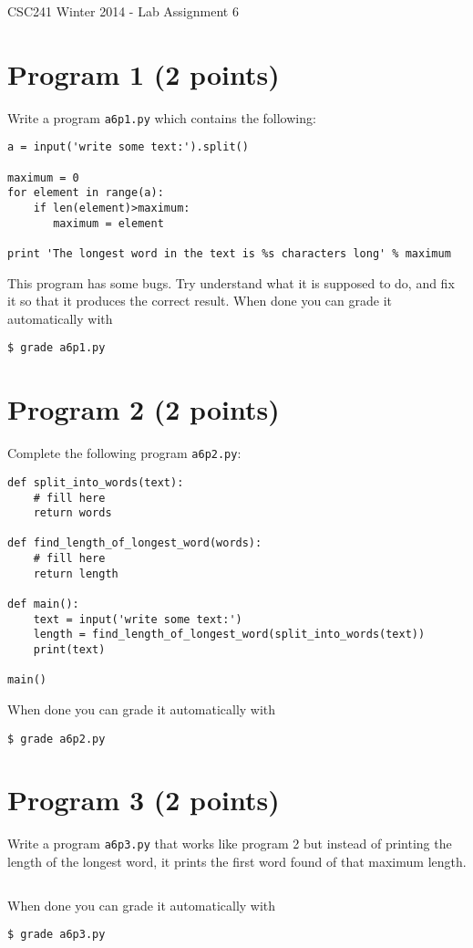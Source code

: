 \documentclass[12pt]{article}
\begin{document}
{\Large CSC241 Winter 2014 - Lab Assignment 6}

\section{Program 1 (2 points)}

\noindent
Write a program {\tt a6p1.py} which contains the following:
\begin{verbatim}
a = input('write some text:').split()

maximum = 0
for element in range(a):
    if len(element)>maximum:
       maximum = element

print 'The longest word in the text is %s characters long' % maximum
\end{verbatim}
This program has some bugs. Try understand what it is supposed to do, and fix it so that it produces the correct result.
\noindent When done you can grade it automatically with
\begin{verbatim}
$ grade a6p1.py
\end{verbatim}


\section{Program 2 (2 points)}

\noindent
Complete the following program {\tt a6p2.py}:
\begin{verbatim}
def split_into_words(text):
    # fill here
    return words

def find_length_of_longest_word(words):
    # fill here
    return length

def main():
    text = input('write some text:')
    length = find_length_of_longest_word(split_into_words(text))
    print(text)

main()
\end{verbatim}
\noindent When done you can grade it automatically with
\begin{verbatim}
$ grade a6p2.py
\end{verbatim}


\section{Program 3 (2 points)}

\noindent
Write a program {\tt a6p3.py} that works like program 2 but instead of printing the length of the longest word, it prints the first word found of that maximum length. 
\begin{verbatim}
\end{verbatim}
\noindent When done you can grade it automatically with
\begin{verbatim}
$ grade a6p3.py
\end{verbatim}
\end{document}
